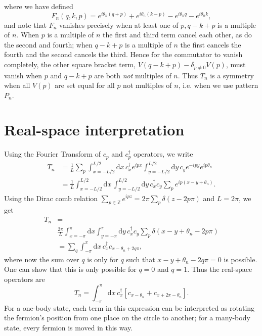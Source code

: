 \documentclass[aps,prx,10pt,twocolumn,amsmath,amssymb,superscriptaddress]{revtex4-2}
\newcommand{\cdag}{c^{\dag}}
\theoremstyle{definition}
\theoremstyle{definition}
\begin{document}
where we have defined
\begin{equation}
    F_n(q,k,p) = e^{i\theta_n (q+p)} + e^{i\theta_n (k-p)} - e^{i\theta_n q} - e^{i\theta_n k},
\end{equation}
and note that $F_n$ vanishes precisely when at least one of $p, q-k+p$ is a multiple of $n$. When $p$ is a multiple of $n$ the first and third term cancel each other, as do the second and fourth; when $q-k+p$ is a multiple of $n$ the first cancels the fourth and the second cancels the third. 
Hence for the commutator to vanish completely, the other square bracket term, $V(q-k+p) - \delta_{p \neq 0}V(p)$, must vanish when $p$ and $q-k+p$ are both \textit{not} multiples of $n$. Thus $T_n$ is a symmetry when all $V(p)$ are set equal for all $p$ not multiples of $n$, i.e. when we use pattern $P_n$.

\section{Real-space interpretation}
Using the Fourier Transform of $c_p$ and $\cdag_p$ operators, we write 
\begin{equation}
  \begin{aligned}
T_n &= \frac{1}{L}\sum_{p}\int_{x=-L/2}^{L/2} \mathrm{d} x \, c^{\dag}_{x}e^{ipx}\int_{y=-L/2}^{L/2} \mathrm{d} y \, c_ye^{-ipy} e^{ip\theta_n} \\
&= \frac{1}{L}\int_{x=-L/2}^{L/2} \mathrm{d} x \, \int_{y=-L/2}^{L/2} \mathrm{d} y \, c^{\dag}_{x}c_y \sum_{p} e^{ip(x-y+\theta_n)}.
  \end{aligned}
\end{equation}
Using the Dirac comb relation $\sum_{p \in \mathbb{Z}} e^{ipz} = 2\pi\sum_p \delta(z - 2p\pi)$ and $L = 2\pi$, we get
\begin{equation}
  \begin{aligned}
T_n& =\\& \frac{2\pi}{L}\int_{x=-\pi}^{\pi} \mathrm{d} x \int_{y=-\pi}^{\pi} \mathrm{d} y \, c^{\dag}_{x}c_y \sum_{p} \delta(x-y+\theta_n - 2p\pi) \\
&= \sum_{q}\int_{-\pi}^{\pi} \mathrm{d} x \, c^{\dag}_{x}c_{x-\theta_n+2q\pi},
  \end{aligned}
\end{equation}
where now the sum over $q$ is only for $q$ such that $x-y+\theta_n - 2q\pi = 0$ is possible. One can show that this is only possible for $q=0$ and $q=1$. Thus the real-space operators are
\begin{equation}
T_n = \int_{-\pi}^{\pi} \mathrm{d} x \, \cdag_x \left[c_{x-\theta_n} + c_{x + 2\pi - \theta_n}\right].
\end{equation} 
For a one-body state, each term in this expression can be interpreted as rotating the fermion's position from one place on the circle to another; for a many-body state, every fermion is moved in this way.
\end{document}
